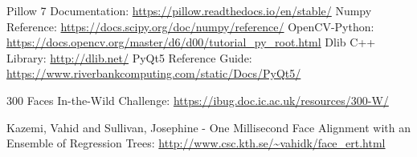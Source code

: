 \newpage
\begin{thebibliography}{9}
    Pillow 7 Documentation: \url{https://pillow.readthedocs.io/en/stable/}
    Numpy Reference: \url{https://docs.scipy.org/doc/numpy/reference/}
    OpenCV-Python: \url{https://docs.opencv.org/master/d6/d00/tutorial_py_root.html}
    Dlib C++ Library: \url{http://dlib.net/}
    PyQt5 Reference Guide: \url{https://www.riverbankcomputing.com/static/Docs/PyQt5/}

    300 Faces In-the-Wild Challenge: \url{https://ibug.doc.ic.ac.uk/resources/300-W/}


    Kazemi, Vahid and Sullivan, Josephine - One Millisecond Face Alignment with an Ensemble of Regression Trees:
    \url{http://www.csc.kth.se/~vahidk/face_ert.html}

    

\end{thebibliography}